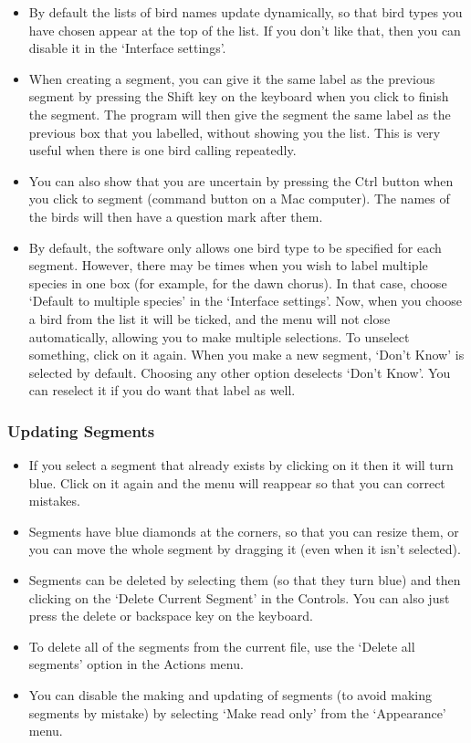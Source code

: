 \documentclass{article}
\begin{document}
\begin{itemize}
\item By default the lists of bird names update dynamically, so that bird types you have chosen appear at the top of the list. If you don't like that, then you can disable it in the `Interface settings'. 

\item When creating a segment, you can give it the same label as the previous segment by pressing the Shift key on the keyboard when you click to finish the segment. The program will then give the segment the same label as the previous box that you labelled, without showing you the list. This is very useful when there is one bird calling repeatedly.

\item You can also show that you are uncertain by pressing the Ctrl button when you click to segment (command button on a Mac computer). The names of the birds will then have a question mark after them.

\item By default, the software only allows one bird type to be specified for each segment. However, there may be times when you wish to label multiple species in one box (for example, for the dawn chorus). In that case, choose `Default to multiple species' in the `Interface settings'. Now, when you choose a bird from the list it will be ticked, and the menu will not close automatically, allowing you to make multiple selections. To unselect something, click on it again. When you make a new segment, `Don't Know' is selected by default. Choosing any other option deselects `Don't Know'. You can reselect it if you do want that label as well. 
\end{itemize}

\subsubsection*{Updating Segments}

\begin{itemize}
\item If you select a segment that already exists by clicking on it then it will turn blue. Click on it again and the menu will reappear so that you can correct mistakes.
\item Segments have blue diamonds at the corners, so that you can resize them, or you can move the whole segment by dragging it (even when it isn't selected). 
\item Segments can be deleted by selecting them (so that they turn blue) and then clicking on the `Delete Current Segment' in the Controls. You can also just press the delete or backspace key on the keyboard. 
\item To delete all of the segments from the current file, use the `Delete all segments' option in the Actions menu. 
\item You can disable the making and updating of segments (to avoid making segments by mistake) by selecting `Make read only' from the `Appearance' menu.
\end{itemize}
\end{document}
